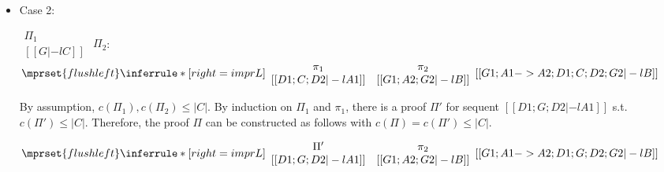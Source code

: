 \begin{itemize}
\item Case 2:
      \begin{center}
        \scriptsize
        \begin{math}
          \begin{array}{c}
            \Pi_1 \\
            {[[G |-l C]]}
          \end{array}
        \end{math}
        \qquad\qquad
        $\Pi_2$:
        \begin{math}
          $$\mprset{flushleft}
          \inferrule* [right={\tiny imprL}] {
            {
              \begin{array}{cc}
                \pi_1 & \pi_2 \\
                {[[D1; C; D2 |-l A1]]} & {[[G1; A2; G2 |-l B]]}
              \end{array}
            }
          }{[[G1; A1 -> A2; D1; C; D2; G2 |-l B]]}
        \end{math}
      \end{center}
      By assumption, $c(\Pi_1),c(\Pi_2)\leq |C|$. By induction on $\Pi_1$
      and $\pi_1$, there is a proof $\Pi'$ for sequent
      $[[D1; G; D2 |-l A1]]$ s.t. $c(\Pi') \leq |C|$. Therefore, the proof
      $\Pi$ can be constructed as follows with $c(\Pi) = c(\Pi') \leq |C|$.
      \begin{center}
        \scriptsize
        \begin{math}
          $$\mprset{flushleft}
          \inferrule* [right={\tiny imprL}] {
            {
              \begin{array}{cc}
                \Pi' & \pi_2 \\
                {[[D1; G; D2 |-l A1]]} & {[[G1; A2; G2 |-l B]]}
              \end{array}
            }
          }{[[G1; A1 -> A2; D1; G; D2; G2 |-l B]]}
        \end{math}
      \end{center}


\end{itemize}
